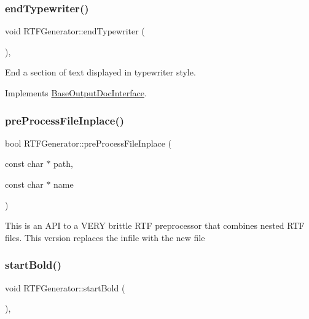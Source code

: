 \subsubsection{\texorpdfstring{endTypewriter()}{endTypewriter()}}
{\footnotesize\ttfamily void R\+T\+F\+Generator\+::end\+Typewriter (\begin{DoxyParamCaption}{ }\end{DoxyParamCaption})\hspace{0.3cm}{\ttfamily [inline]}, {\ttfamily [virtual]}}

End a section of text displayed in typewriter style. 

Implements \mbox{\hyperlink{class_base_output_doc_interface_a9e987baf8aed76f0e5e6676b3238d2c8}{Base\+Output\+Doc\+Interface}}.

\mbox{\label{class_r_t_f_generator_a62498deb4b617b2cfb75381f6508a4ed}} 
\subsubsection{\texorpdfstring{preProcessFileInplace()}{preProcessFileInplace()}}
{\footnotesize\ttfamily bool R\+T\+F\+Generator\+::pre\+Process\+File\+Inplace (\begin{DoxyParamCaption}\item[{const char $\ast$}]{path,  }\item[{const char $\ast$}]{name }\end{DoxyParamCaption})\hspace{0.3cm}{\ttfamily [static]}}

This is an A\+PI to a V\+E\+RY brittle R\+TF preprocessor that combines nested R\+TF files. This version replaces the infile with the new file \mbox{\label{class_r_t_f_generator_acb774060df0aaad9be8f91018503b20b}} 
\subsubsection{\texorpdfstring{startBold()}{startBold()}}
{\footnotesize\ttfamily void R\+T\+F\+Generator\+::start\+Bold (\begin{DoxyParamCaption}{ }\end{DoxyParamCaption})\hspace{0.3cm}{\ttfamily [inline]}, {\ttfamily [virtual]}}

